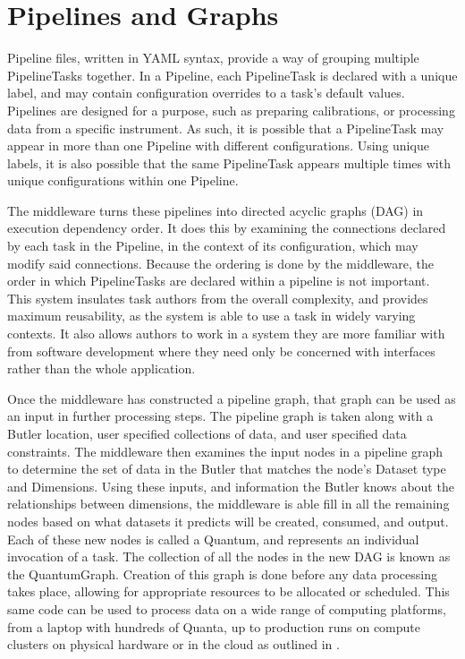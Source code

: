 \documentclass[11pt,twoside]{article}
\begin{document}
\section{Pipelines and Graphs}
Pipeline files, written in YAML syntax, provide a way of grouping multiple PipelineTasks together. In a Pipeline, each PipelineTask is declared with a unique label, and may contain configuration overrides to a task's default values. Pipelines are designed for a purpose, such as preparing calibrations, or processing data from a specific instrument. As such, it is possible that a PipelineTask may appear in more than one Pipeline with different configurations. Using unique labels, it is also possible that the same PipelineTask appears multiple times with unique configurations within one Pipeline.

The middleware turns these pipelines into directed acyclic graphs (DAG) in execution dependency order. It does this by examining the connections declared by each task in the Pipeline, in the context of its configuration, which may modify said connections. Because the ordering is done by the middleware, the order in which PipelineTasks are declared within a pipeline is not important. This system insulates task authors from the overall complexity, and provides maximum reusability, as the system is able to use a task in widely varying contexts. It also allows authors to work in a system they are more familiar with from software development where they need only be concerned with interfaces rather than the whole application.

Once the middleware has constructed a pipeline graph, that graph can be used as an input in further processing steps. The pipeline graph is taken along with a Butler location, user specified collections of data, and user specified data constraints.  The middleware then examines the input nodes in a pipeline graph to determine the set of data in the Butler that matches the node's Dataset type and Dimensions. Using these inputs, and information the Butler knows about the relationships between dimensions, the middleware is able fill in all the remaining nodes based on what datasets it predicts will be created, consumed, and output. Each of these new nodes is called a Quantum, and represents an individual invocation of a task. The collection of all the nodes in the new DAG is known as the QuantumGraph. Creation of this graph is done before any data processing takes place, allowing for appropriate resources to be allocated or scheduled. This same code can be used to process data on a wide range of computing platforms, from a laptop with hundreds of Quanta, up to production runs on compute clusters on physical hardware or in the cloud as outlined in \citet{P52_adassxxxii}.
\end{document}
